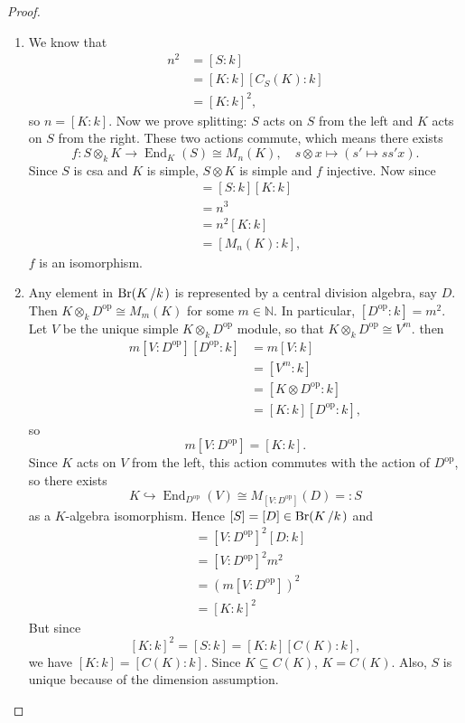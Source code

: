 \documentclass[10pt, a4paper]{article}
\newenvironment{noticeC}{%
  \tcolorbox[%
  notitle,
  empty,
  enhanced,  %
  breakable,
  coltext=black, 
  fontupper=\rmfamily,
  noparskip,
  sharp corners,
  boxrule=-1pt,  %
  frame hidden,
  left=7pt,  %
  right=7pt,
  top=5pt,
  bottom=5pt,
  before skip=2.5ex plus 2pt,
  after skip=2.5ex plus 2pt,
  overlay unbroken and last={%
  },
  ]}
{\endtcolorbox}
\newenvironment{myproof}%
  {\begin{noticeC}\begin{proof}}%
  {\end{proof}\end{noticeC}}
\newcommand{\N}{\mathbb {N}}
\newcommand{\quot}[2]{{\raisebox{0em}{$#1$}\left/\raisebox{0em}{$#2$}\right.}}
\DeclareMathOperator{\op}{op}
\DeclareMathOperator{\en}{End}
\DeclareMathOperator{\brauer}{Br}
\begin{document}
\begin{myproof}
  \begin{enumerate}
    \item We know that 
    \begin{align*}
      n^2 &= [S: k]\\
      &= [K: k] [C_S(K) : k]\\
      &= [K: k] ^2,
    \end{align*}
    so $n = [K: k]$. Now we prove splitting: $S$ acts on $S$ from the left and $K$ acts on $S$ from the right.
    These two actions commute, which means there exists 
    $$f: S \otimes_k K \to \en_K (S) \cong M_n (K),\quad s \otimes x \mapsto (s' \mapsto ss'x).$$
    Since $S$ is csa and $K$ is simple, $S \otimes K$ is simple and $f$ injective.
    Now since 
    \begin{align*}
      [S \otimes K : k] &= [S: k] [K : k]\\
      &= n^3 \\
      &= n^2 [K : k] \\
      &= [M_n (K): k],
    \end{align*}
    $f$ is an isomorphism.
    \item Any element in $\brauer (\quot{K}{k})$ is represented by a central division algebra, say $D$.
    Then $K \otimes_k D^{\op} \cong M_m (K)$ for some $m \in \N$.
    In particular, $[D^{\op} : k] = m^2$. Let $V$ be the unique simple $K \otimes_k D^{\op}$ module,
    so that $K \otimes_k D^{\op} \cong V^m$.
    then 
    \begin{align*}
      m [V : D^{\op}] [D^{\op} : k] &= m [V : k] \\
      &= [V^m : k]\\
      &= [K \otimes D^{\op} : k]\\
      &= [K : k] [D^{\op}: k],
    \end{align*}
    so $$m [V : D^{\op}] = [K : k].$$
    Since $K$ acts on $V$ from the left, this action commutes with the action of $D^{\op}$, so there exists 
    $$K \hookrightarrow \en_{D^{\op}}  (V) \cong M_{[V : D^{\op}]} (D) =: S$$
    as a $K$-algebra isomorphism.
    Hence $[S] = [D] \in \brauer (\quot{K}{k})$ and 
    \begin{align*}
      [S : k] &= [V : D^{\op}]^2 [D : k]\\
      &= [V : D^{\op}]^2 m^2\\
      &= (m [V : D^{\op}])^2\\
      &= [K: k]^2
    \end{align*}
    But since $$[K : k]^2 = [S : k] = [K: k] [C(K) : k],$$ we have 
    $[K : k] = [C(K): k]$. Since $K \subseteq C(K)$, $K = C(K)$.
    Also, $S$ is unique because of the dimension assumption. \qedhere
  \end{enumerate}
\end{myproof}
\end{document}
